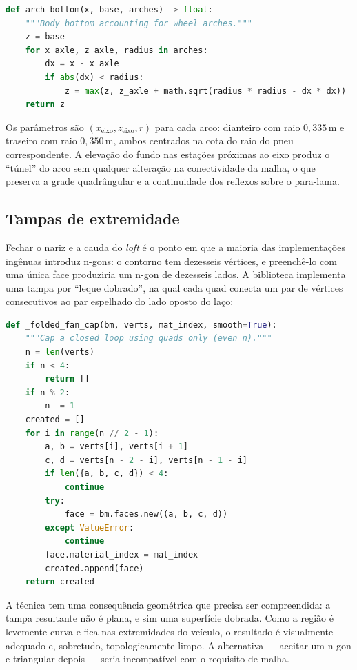 \begin{lstlisting}[language=Python]
def arch_bottom(x, base, arches) -> float:
    """Body bottom accounting for wheel arches."""
    z = base
    for x_axle, z_axle, radius in arches:
        dx = x - x_axle
        if abs(dx) < radius:
            z = max(z, z_axle + math.sqrt(radius * radius - dx * dx))
    return z
\end{lstlisting}

Os par\^ametros s\~ao $(x_{\text{eixo}}, z_{\text{eixo}}, r)$ para cada arco: dianteiro com
raio $0,335$\,m e traseiro com raio $0,350$\,m, ambos centrados na cota do raio do pneu
correspondente. A eleva{\c{c}}\~ao do fundo nas esta{\c{c}}\~oes pr\'oximas ao eixo produz o
``t\'unel'' do arco sem qualquer altera{\c{c}}\~ao na conectividade da malha, o que preserva a
grade quadr\^angular e a continuidade dos reflexos sobre o para-lama.

\subsection{Tampas de extremidade}\label{sec:tampas}

Fechar o nariz e a cauda do \emph{loft} \'e o ponto em que a maioria das implementa{\c{c}}\~oes
ing\^enuas introduz n-gons: o contorno tem dezesseis v\'ertices, e preench\^e-lo com uma \'unica
face produziria um n-gon de dezesseis lados. A biblioteca implementa uma tampa por ``leque
dobrado'', na qual cada quad conecta um par de v\'ertices consecutivos ao par espelhado do lado
oposto do la\c{c}o:

\begin{lstlisting}[language=Python]
def _folded_fan_cap(bm, verts, mat_index, smooth=True):
    """Cap a closed loop using quads only (even n)."""
    n = len(verts)
    if n < 4:
        return []
    if n % 2:
        n -= 1
    created = []
    for i in range(n // 2 - 1):
        a, b = verts[i], verts[i + 1]
        c, d = verts[n - 2 - i], verts[n - 1 - i]
        if len({a, b, c, d}) < 4:
            continue
        try:
            face = bm.faces.new((a, b, c, d))
        except ValueError:
            continue
        face.material_index = mat_index
        created.append(face)
    return created
\end{lstlisting}

A t\'ecnica tem uma consequ\^encia geom\'etrica que precisa ser compreendida: a tampa
resultante n\~ao \'e plana, e sim uma superf\'icie dobrada. Como a regi\~ao \'e
levemente curva e fica nas extremidades do ve\'iculo, o resultado \'e visualmente adequado e,
sobretudo, topologicamente limpo. A alternativa --- aceitar um n-gon e triangular depois ---
seria incompat\'ivel com o requisito de malha.

